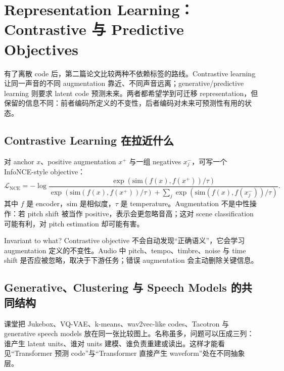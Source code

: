 \section{Representation Learning：Contrastive 与 Predictive Objectives}

有了离散 code 后，第二篇论文比较两种不依赖标签的路线。Contrastive learning 让同一声音的不同 augmentation 靠近、不同声音远离；generative/predictive learning 则要求 latent code 预测未来。两者都希望学到可迁移 representation，但保留的信息不同：前者编码所定义的不变性，后者编码对未来可预测性有用的状态。

\subsection{Contrastive Learning 在拉近什么}

对 anchor $x$、positive augmentation $x^+$ 与一组 negatives $x_j^-$，可写一个 InfoNCE-style objective：
\[
\mathcal{L}_{\mathrm{NCE}}
=-\log
\frac{\exp(\mathrm{sim}(f(x),f(x^+))/\tau)}
{\exp(\mathrm{sim}(f(x),f(x^+))/\tau)
+\sum_j\exp(\mathrm{sim}(f(x),f(x_j^-))/\tau)}.
\]
其中 $f$ 是 encoder，$\mathrm{sim}$ 是相似度，$\tau$ 是 temperature。Augmentation 不是中性操作：若 pitch shift 被当作 positive，表示会更忽略音高；这对 scene classification 可能有利，对 pitch estimation 却可能有害。


\begin{warningbox}{Invariant to what?}
Contrastive objective 不会自动发现“正确语义”，它会学习 augmentation 定义的不变性。Audio 中 pitch、tempo、timbre、noise 与 time shift 是否应被忽略，取决于下游任务；错误 augmentation 会主动删除关键信息。
\end{warningbox}

\subsection{Generative、Clustering 与 Speech Models 的共同结构}

课堂把 Jukebox、VQ-VAE、k-means、wav2vec-like codes、Tacotron 与 generative speech models 放在同一张比较图上。名称虽多，问题可以压成三列：谁产生 latent units、谁对 units 建模、谁负责重建或读出。这样才能看见“Transformer 预测 code”与“Transformer 直接产生 waveform”处在不同抽象层。


